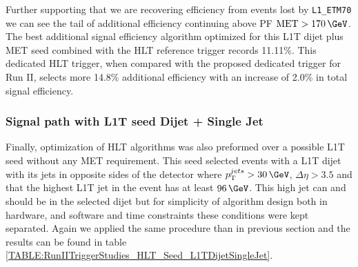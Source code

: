Further supporting that we are recovering efficiency from events lost by \verb|L1_ETM70| we can see the tail of additional efficiency continuing above \gls{PF} $\text{MET}>170\,\GeV$. The best additional signal efficiency algorithm optimized for this \gls{L1T} dijet plus \gls{MET} seed combined with the \gls{HLT} reference trigger records 11.11\%. This dedicated \gls{HLT} trigger, when compared with the proposed dedicated trigger for Run II, selects more 14.8\% additional efficiency with an increase of 2.0\% in total signal efficiency. 

\subsubsection{Signal path with L1T seed Dijet + Single Jet}
\label{SECTION:RunIITriggerStudies_HLTAlgorithmDevelopment_L1TDijetSingleJet}


Finally, optimization of \gls{HLT} algorithms was also preformed over a possible \gls{L1T} seed without any \gls{MET} requirement. This seed selected events with a \gls{L1T} dijet with its jets in opposite sides of the detector where $\pt^{jets}>30\,\GeV$, $\Delta\eta>3.5$ and that the highest \pt \gls{L1T} jet in the event has at least $96\,\GeV$. This high \pt jet can and should be in the selected dijet but for simplicity of algorithm design both in hardware, and software and time constraints these conditions were kept separated. Again we applied the same procedure than in previous section and the results can be found in table \ref{TABLE:RunIITriggerStudies_HLT_Seed_L1TDijetSingleJet}.

